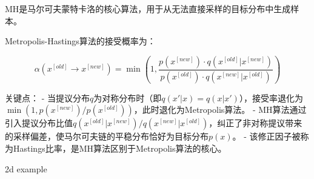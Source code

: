 \documentclass[
]{book}
\newenvironment{Shaded}{\begin{snugshade}}{\end{snugshade}}
\newcommand{\CommentTok}[1]{\textcolor[rgb]{0.56,0.35,0.01}{\textit{#1}}}
\newcommand{\ConstantTok}[1]{\textcolor[rgb]{0.56,0.35,0.01}{#1}}
\newcommand{\ControlFlowTok}[1]{\textcolor[rgb]{0.13,0.29,0.53}{\textbf{#1}}}
\newcommand{\DecValTok}[1]{\textcolor[rgb]{0.00,0.00,0.81}{#1}}
\newcommand{\FunctionTok}[1]{\textcolor[rgb]{0.13,0.29,0.53}{\textbf{#1}}}
\newcommand{\NormalTok}[1]{#1}
\newcommand{\OtherTok}[1]{\textcolor[rgb]{0.56,0.35,0.01}{#1}}
\newcommand{\SpecialCharTok}[1]{\textcolor[rgb]{0.81,0.36,0.00}{\textbf{#1}}}
\begin{document}
MH是马尔可夫蒙特卡洛的核心算法，用于从无法直接采样的目标分布中生成样本。

Metropolis-Hastings算法的接受概率为：

\[\alpha(x^{[old]} \rightarrow x^{[new]}) = \min\left(1, \frac{p(x^{[new]}) \cdot q(x^{[old]} | x^{[new]})}{p(x^{[old]}) \cdot q(x^{[new]} | x^{[old]})}\right)\]

关键点：
- 当提议分布\(q\)为对称分布时（即\(q(x'|x) = q(x|x')\)），接受率退化为\(\min(1, p(x^{[new]})/p(x^{[old]}))\)，此时退化为Metropolis算法。
- MH算法通过引入提议分布比值\(q(x^{[old]}|x^{[new]})/q(x^{[new]}|x^{[old]})\)，纠正了非对称提议带来的采样偏差，使马尔可夫链的平稳分布恰好为目标分布\(p(x)\)。
- 该修正因子被称为Hastings比率，是MH算法区别于Metropolis算法的核心。

2d example

\begin{Shaded}
\end{Shaded}
\end{document}
